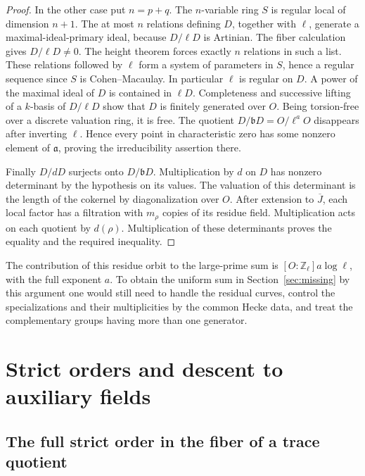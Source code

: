 \documentclass[a4paper,11pt]{article}
\theoremstyle{definition}
\theoremstyle{remark}
\newcommand{\ZZ}{\mathbb Z}\newcommand{\ord}{\operatorname{ord}}
\numberwithin{equation}{section}
\begin{document}
\begin{proof}
In the other case put \(n=p+q\). The \(n\)-variable ring \(S\)
is regular local of dimension \(n+1\). The at most \(n\)
relations defining \(D\), together with \(\ell\), generate a
maximal-ideal-primary ideal, because \(D/\ell D\) is Artinian.
The fiber calculation gives \(D/\ell D\ne0\).
The height theorem forces exactly \(n\) relations in such
a list. These relations followed by \(\ell\) form a system of
parameters in \(S\), hence a regular sequence since \(S\) is
Cohen--Macaulay. In particular \(\ell\) is regular on \(D\).
A power of the maximal ideal of \(D\) is contained in \(\ell D\).
Completeness and successive lifting of a \(k\)-basis of
\(D/\ell D\) show that \(D\) is finitely generated over \(O\).
Being torsion-free over a discrete valuation ring, it is free.
The quotient \(D/\mathfrak bD=O/\ell^aO\) disappears after
inverting \(\ell\). Hence every point in characteristic zero
has some nonzero element of \(\mathfrak a\), proving the
irreducibility assertion there.

Finally \(D/dD\) surjects onto \(D/\mathfrak bD\). Multiplication
by \(d\) on \(D\) has nonzero determinant by the hypothesis
on its values. The valuation of this determinant is the length
of the cokernel by diagonalization over \(O\). After extension
to \(\overline J\), each local factor has a filtration with
\(m_\rho\) copies of its residue field. Multiplication acts on
each quotient by \(d(\rho)\). Multiplication of these determinants
proves the equality and the required inequality.
\end{proof}

The contribution of this residue orbit to the large-prime
sum is \([O:\ZZ_\ell]a\log\ell\), with the full exponent \(a\). To obtain the uniform sum in
Section~\ref{sec:missing} by this argument one would still
need to handle the residual curves, control the specializations
and their multiplicities by the common Hecke data, and treat
the complementary groups having more than one generator.

\section{Strict orders and descent to auxiliary fields}\label{nav:chapter-descent-strict-orders}
\subsection{The full strict order in the fiber of a trace quotient}
\label{sec:negativecovariants398}
\end{document}
